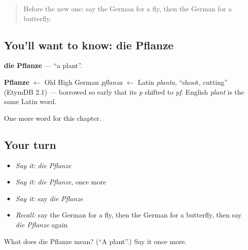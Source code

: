 \label{lesson:GE-C198-pflanze}



\begin{quote}
Before the new one: say the German for a fly, then the German for a butterfly.
\end{quote}

\subsection*{You'll want to know: die Pflanze}
\textbf{die Pflanze} — \textquotedblleft{}a plant\textquotedblright{}.

\begin{cousinweb}
\textbf{Pflanze} $\leftarrow$ Old High German \emph{pflanza} $\leftarrow$ Latin \emph{planta}, \textquotedblleft{}shoot, cutting\textquotedblright{} (EtymDB 2.1) — borrowed so early that its \emph{p} shifted to \emph{pf}. English \emph{plant} is the same Latin word.
\end{cousinweb}

\begin{grammarlens}[title={What you've built}]
One more word for this chapter.
\end{grammarlens}

\subsection*{Your turn}
\begin{itemize}
\raggedright
  \item \emph{Say it:} \emph{die Pflanze}
  \item \emph{Say it:} \emph{die Pflanze}, once more
  \item \emph{Say it:} say \emph{die Pflanze}
  \item \emph{Recall:} say the German for a fly, then the German for a butterfly, then say \emph{die Pflanze} again
\end{itemize}

\begin{tcolorbox}[breakable,colback=teal!4,colframe=teal!35!black,title={Before you move on}]
What does die Pflanze mean? (\textquotedblleft{}A plant\textquotedblright{}.) Say it once more.
\end{tcolorbox}
